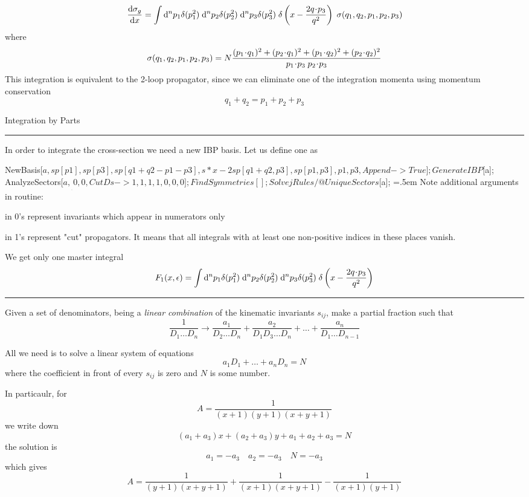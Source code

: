 \documentclass[11pt]{article}
\newcommand{\titleb}[2]{{\color{Blue}{\LARGE #1}\hfill{\Large #2}\vspace{-2mm}\par\rule{\textwidth}{1pt}\vs}}
\newcommand{\titlea}[1]{\titleb{#1}{}}
\newenvironment{codeblock}
 {\SaveVerbatim{cverb}}
 {\endSaveVerbatim
  \flushleft\fboxrule=0pt\fboxsep=.5em
  \colorbox{LightGray}{%
    \makebox[\dimexpr\linewidth-2\fboxsep][l]{\BUseVerbatim{cverb}}}
  \endflushleft}
\newcommand{\spr}[2]{#1\!\cdot\!#2}
\begin{document}
$$
\frac{\mathrm{d}\sigma_g}{\mathrm{d} x} = \int \mathrm{d}^n p_1 \delta(p_1^2) \; \mathrm{d}^n p_2 \delta(p_2^2) \; \mathrm{d}^n p_3 \delta(p_3^2) \; \delta\left(x-\frac{2 q\!\cdot\!p_3}{q^2}\right) \; \sigma(q_1,q_2,p_1,p_2,p_3)
$$
where
$$
\sigma(q_1,q_2,p_1,p_2,p_3)
=
N \frac{(\spr{p_1}{q_1})^2+(\spr{p_2}{q_1})^2+(\spr{p_1}{q_2})^2+(\spr{p_2}{q_2})^2}{\spr{p_1}{p_3}\x\spr{p_2}{p_3}}
$$
This integration is equivalent to the 2-loop propagator, since we can eliminate one of the integration momenta using momentum conservation
$$ q_1 + q_2 = p_1 + p_2 + p_3 $$
\newpage


\titleb{Example 2}{Integration by Parts}

In order to integrate the cross-section we need a new IBP basis. Let us define one as
\vs

\begin{codeblock}
NewBasis[$a,{sp[p1], sp[p3], sp[q1+q2-p1-p3], s*x-2sp[q1+q2,p3], sp[p1,p3]},
            {p1, p3}, Append -> True];

GenerateIBP[$a];
AnalyzeSectors[$a, {___,0,0}, CutDs -> {1,1,1,1,0,0,0}];
FindSymmetries[];

SolvejRules /@ UniqueSectors[$a];
\end{codeblock}
\vs
Note additional arguments in  routine:
\bi
  \item in  0's represent invariants which appear in numerators only
  \item in  1's represent "cut" propagators. It means that all integrals with at least one non-positive indices in these places vanish.
\ei

\vs
We get only one master integral
$$
F_1(x,\epsilon) = \int \mathrm{d}^n p_1 \delta(p_1^2) \; \mathrm{d}^n p_2 \delta(p_2^2) \; \mathrm{d}^n p_3 \delta(p_3^2) \; \delta\left(x-\frac{2 q\!\cdot\!p_3}{q^2}\right)
$$
\newpage


\titlea{Partial Fractioning}
Given a set of denominators, being a {\em linear combination} of the kinematic invariants $s_{ij}$, make a partial fraction such that
$$
  \frac{1}{D_1\ldots D_n} \to \frac{a_1}{D_2 \ldots D_n} +  \frac{a_2}{D_1 D_3 \ldots D_n} + \ldots + \frac{a_n}{D_1 \ldots D_{n-1}}
$$

All we need is to solve a linear system of equations
$$ a_1 D_1 + \ldots + a_n D_n = N $$
where the coefficient in front of every $s_{ij}$ is zero and $N$ is some number.

\vs
In particaulr, for
$$
  A = \frac{1}{(x+1)(y+1)(x+y+1)}
$$
we write down
$$
  (a_1 + a_3) x + (a_2 + a_3) y + a_1 + a_2 + a_3 = N
$$
the solution is
$$
  a_1 = - a_3 \quad  a_2 = - a_3 \quad N = - a_3
$$
which gives
$$
  A = \frac{1}{(y+1)(x+y+1)} + \frac{1}{(x+1)(x+y+1)} - \frac{1}{(x+1)(y+1)}
$$
\newpage
\end{document}
